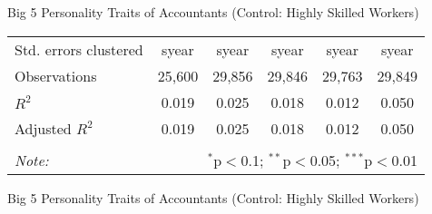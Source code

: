 \documentclass[
  9pt,
  ignorenonframetext,
]{beamer}
\begin{document}
\begin{frame}{Big 5 Personality Traits of Accountants (Control: Highly
Skilled Workers)}
\begin{center}
{\begin{tabular}{lccccc}
Std. errors clustered & syear & syear & syear & syear & syear \\ 
Observations & 25,600 & 29,856 & 29,846 & 29,763 & 29,849 \\ 
$R^{2}$ & 0.019 & 0.025 & 0.018 & 0.012 & 0.050 \\ 
Adjusted $R^{2}$ & 0.019 & 0.025 & 0.018 & 0.012 & 0.050 \\ 
\hline 
\hline \\[-1.8ex] 
\textit{Note:}  & \multicolumn{5}{r}{$^{*}$p$<$0.1; $^{**}$p$<$0.05; $^{***}$p$<$0.01} \\ 
\end{tabular}}
\end{center}
\end{frame}

\begin{frame}{Big 5 Personality Traits of Accountants (Control: Highly
Skilled Workers)}
\protect\hypertarget{big-5-personality-traits-of-accountants-control-highly-skilled-workers-1}{}
\begin{center}
\end{center}
\end{frame}
\end{document}
